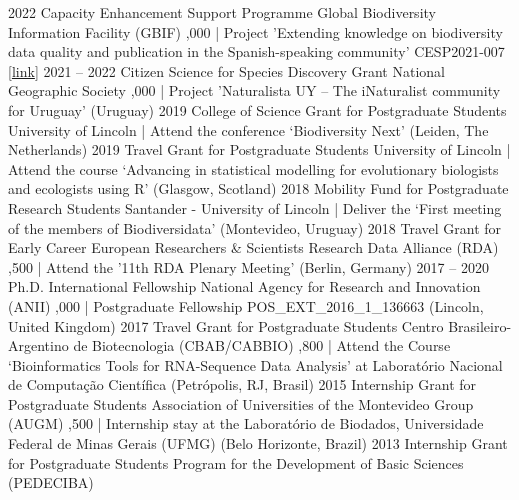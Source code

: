 \documentclass[9pt]{developercv} %
\begin{document}
\hfill 


\begin{entrylist}
	\entry
		{2022}
		{Capacity Enhancement Support Programme}
		{Global Biodiversity Information Facility (GBIF)}
		{,000 | Project 'Extending knowledge on biodiversity data quality and publication in the Spanish-speaking community' CESP2021-007 [\href{https://www.gbif.org/project/CESP2021-007/}{link}]}
	\entry
		{2021 -- 2022}
		{Citizen Science for Species Discovery Grant}
		{National Geographic Society}
		{,000 | Project 'Naturalista UY – The iNaturalist community for Uruguay' (Uruguay)}
	\entry
		{2019}
		{College of Science Grant for Postgraduate Students}
		{University of Lincoln }
		{ | Attend the conference ‘Biodiversity Next’ (Leiden, The Netherlands)}
	\entry
		{2019}
		{Travel Grant for Postgraduate Students}
		{University of Lincoln }
		{ | Attend the course ‘Advancing in statistical modelling for evolutionary biologists and ecologists using R’ (Glasgow, Scotland)}
	\entry
		{2018}
		{Mobility Fund for Postgraduate Research Students}
		{Santander - University of Lincoln}
		{ | Deliver the ‘First meeting of the members of Biodiversidata’ (Montevideo, Uruguay)}
	\entry
		{2018}
		{Travel Grant for Early Career European Researchers \& Scientists }
		{Research Data Alliance (RDA)}
		{,500 | Attend the '11th RDA Plenary Meeting’ (Berlin, Germany)}
	\entry
		{2017 -- 2020}
		{Ph.D. International Fellowship}
		{National Agency for Research and Innovation (ANII)}
		{,000 | Postgraduate Fellowship POS\_EXT\_2016\_1\_136663 (Lincoln, United Kingdom)}
	\entry
		{2017}
		{Travel Grant for Postgraduate Students}
		{Centro Brasileiro-Argentino de Biotecnologia (CBAB/CABBIO)}
		{,800 | Attend the Course ‘Bioinformatics Tools for RNA-Sequence Data Analysis’ at Laboratório Nacional de Computação Científica (Petrópolis, RJ, Brasil)}
	\entry
		{2015}
		{Internship Grant for Postgraduate Students}
		{Association of Universities of the Montevideo Group (AUGM)}
		{,500 | Internship stay at the Laboratório de Biodados, Universidade Federal de Minas Gerais (UFMG) (Belo Horizonte, Brazil)}
	\entry
		{2013}
		{Internship Grant for Postgraduate Students}
		{Program for the Development of Basic Sciences (PEDECIBA)}

\end{entrylist}
\end{document}

